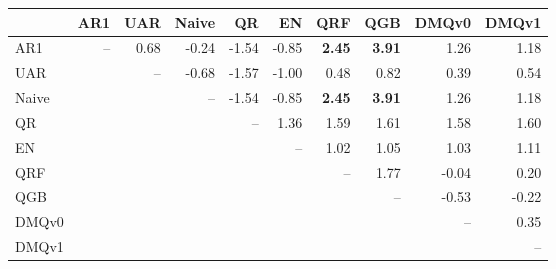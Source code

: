 \begin{tabular}{lrrrrrrrrr}
\toprule
 & AR1 & UAR & Naive & QR & EN & QRF & QGB & DMQv0 & DMQv1 \\
\midrule
AR1 & -- & 0.68 & -0.24 & -1.54 & -0.85 & \textbf{2.45} & \textbf{3.91} & 1.26 & 1.18 \\
UAR &  & -- & -0.68 & -1.57 & -1.00 & 0.48 & 0.82 & 0.39 & 0.54 \\
Naive &  &  & -- & -1.54 & -0.85 & \textbf{2.45} & \textbf{3.91} & 1.26 & 1.18 \\
QR &  &  &  & -- & 1.36 & 1.59 & 1.61 & 1.58 & 1.60 \\
EN &  &  &  &  & -- & 1.02 & 1.05 & 1.03 & 1.11 \\
QRF &  &  &  &  &  & -- & 1.77 & -0.04 & 0.20 \\
QGB &  &  &  &  &  &  & -- & -0.53 & -0.22 \\
DMQv0 &  &  &  &  &  &  &  & -- & 0.35 \\
DMQv1 &  &  &  &  &  &  &  &  & -- \\
\bottomrule
\end{tabular}
